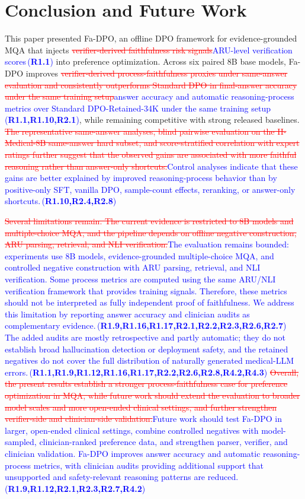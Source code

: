 \documentclass[a4paper,fleqn,doubleblind]{cas-sc}
\DeclareRobustCommand{\deleted}[1]{\textcolor{red}{\sout{#1}}}
\DeclareRobustCommand{\added}[1]{\textcolor{blue}{#1}}
\DeclareRobustCommand{\revtag}[1]{\textcolor{blue}{\scriptsize\,(\textbf{#1})}}
\begin{document}
\section{Conclusion and Future Work}
This paper presented Fa-DPO, an offline DPO framework for evidence-grounded MQA that injects \deleted{verifier-derived faithfulness risk signals}\added{ARU-level verification scores}\revtag{R1.1} into preference optimization. Across six paired 8B base models, Fa-DPO improves \deleted{verifier-derived process-faithfulness proxies under same-answer evaluation and consistently outperforms Standard DPO in final-answer accuracy under the same training setup}\added{answer accuracy and automatic reasoning-process metrics over Standard DPO-Retained-34K under the same training setup}\revtag{R1.1,R1.10,R2.1}, while remaining competitive with strong released baselines. \deleted{The representative same-answer analyses, blind pairwise evaluation on the II-Medical-8B same-answer hard subset, and score-stratified correlation with expert ratings further suggest that the observed gains are associated with more faithful reasoning rather than answer-only shortcuts.}\added{Control analyses indicate that these gains are better explained by improved reasoning-process behavior than by positive-only SFT, vanilla DPO, sample-count effects, reranking, or answer-only shortcuts.}\revtag{R1.10,R2.4,R2.8}

\deleted{Several limitations remain. The current evidence is restricted to 8B models and multiple-choice MQA, and the pipeline depends on offline negative construction, ARU parsing, retrieval, and NLI verification.}\added{The evaluation remains bounded: experiments use 8B models, evidence-grounded multiple-choice MQA, and controlled negative construction with ARU parsing, retrieval, and NLI verification. Some process metrics are computed using the same ARU/NLI verification framework that provides training signals. Therefore, these metrics should not be interpreted as fully independent proof of faithfulness. We address this limitation by reporting answer accuracy and clinician audits as complementary evidence.}\revtag{R1.9,R1.16,R1.17,R2.1,R2.2,R2.3,R2.6,R2.7} \added{The added audits are mostly retrospective and partly automatic; they do not establish broad hallucination detection or deployment safety, and the retained negatives do not cover the full distribution of naturally generated medical-LLM errors.}\revtag{R1.1,R1.9,R1.12,R1.16,R1.17,R2.2,R2.6,R2.8,R4.2,R4.3} \deleted{Overall, the present results establish a stronger process-faithfulness case for preference optimization in MQA, while future work should extend the evaluation to broader model scales and more open-ended clinical settings, and further strengthen verifier-side and clinician-side validation.}\added{Future work should test Fa-DPO in larger, open-ended clinical settings, combine controlled negatives with model-sampled, clinician-ranked preference data, and strengthen parser, verifier, and clinician validation. Fa-DPO improves answer accuracy and automatic reasoning-process metrics, with clinician audits providing additional support that unsupported and safety-relevant reasoning patterns are reduced.}\revtag{R1.9,R1.12,R2.1,R2.3,R2.7,R4.2}
\end{document}
